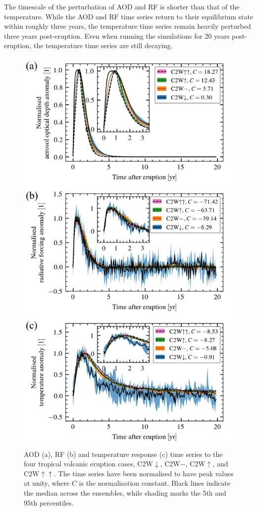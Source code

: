 \documentclass[draft]{agujournal2019}
\begin{document}
The timescale of the perturbation of AOD and RF is shorter than that of the temperature.
While the AOD and RF time series return to their equilibrium state within roughly three
years, the temperature time series remain heavily perturbed three years post-eruption.
Even when running the simulations for 20 years post-eruption, the temperature time
series are still decaying.

\begin{figure}
  \centering
  \includegraphics{figure1.png}

  \caption{AOD (a), RF (b) and temperature response (c) time series to the four tropical
    volcanic eruption cases, C2W\(\downarrow\), C2W\(-\), C2W\(\uparrow\), and
    C2W\(\uparrow\uparrow\). The time series have been normalised to have peak values at
    unity, where \(C\) is the normalisation constant. Black lines indicate the median across
    the ensembles, while shading marks the 5th and 95th
    percentiles.}\label{fig:1_compare_waveform}%
\end{figure}
\end{document}
